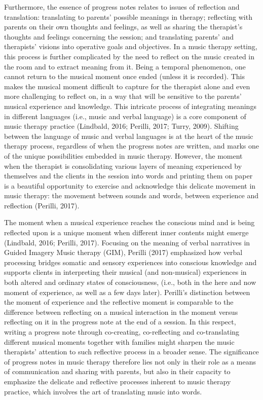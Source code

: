 \documentclass[authordate, empirical]{jote-new-article}
\begin{document}
	Furthermore, the essence of progress notes relates to issues of reflection and translation: translating to parents' possible meanings in therapy; reflecting with parents on their own thoughts and feelings, as well as sharing the therapist's thoughts and feelings concerning the session; and translating parents' and therapists' visions into operative goals and objectives. In a music therapy setting, this process is further complicated by the need to reflect on the music created in the room and to extract meaning from it. Being a temporal phenomenon, one cannot return to the musical moment once ended (unless it is recorded). This makes the musical moment difficult to capture for the therapist alone and even more challenging to reflect on, in a way that will be sensitive to the parents' musical experience and knowledge. This intricate process of integrating meanings in different languages (i.e., music and verbal language) is a core component of music therapy practice (Lindbald, 2016; Perilli, 2017; Turry, 2009). Shifting between the language of music and verbal languages is at the heart of the music therapy process, regardless of when the progress notes are written, and marks one of the unique possibilities embedded in music therapy. However, the moment when the therapist is consolidating various layers of meaning experienced by themselves and the clients in the session into words and printing them on paper is a beautiful opportunity to exercise and acknowledge this delicate movement in music therapy: the movement between sounds and words, between experience and reflection (Perilli, 2017).



	The moment when a musical experience reaches the conscious mind and is being reflected upon is a unique moment when different inner contents might emerge (Lindbald, 2016; Perilli, 2017). Focusing on the meaning of verbal narratives in Guided Imagery Music therapy (GIM), Perilli (2017) emphasized how verbal processing bridges somatic and sensory experiences into conscious knowledge and supports clients in interpreting their musical (and non-musical) experiences in both altered and ordinary states of consciousness, (i.e., both in the here and now moment of experience, as well as a few days later). Perilli's distinction between the moment of experience and the reflective moment is comparable to the difference between reflecting on a musical interaction in the moment versus reflecting on it in the progress note at the end of a session. In this respect, writing a progress note through co-creating, co-reflecting and co-translating different musical moments together with families might sharpen the music therapists' attention to such reflective process in a broader sense. The significance of progress notes in music therapy therefore lies not only in their role as a means of communication and sharing with parents, but also in their capacity to emphasize the delicate and reflective processes inherent to music therapy practice, which involves the art of translating music into words.
\end{document}
